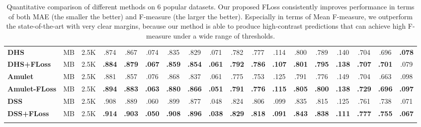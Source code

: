 \documentclass[10pt,twocolumn,letterpaper]{article}
\begin{document}
{\begin{table*}[!htp]
{\begin{tabular}{lcc|ccc|ccc|ccc|ccc|ccc}
  \hline
  \textbf{DHS}~\cite{liu2016dhsnet} &
  MB &
  2.5K & .874 & .867 & .074 & .835 & .829 & .071 &
  .782 & .777 & .114 & .800 & .789 & .140 & .704 & .696 & \textbf{.078} \\
  \textbf{DHS+FLoss}~\cite{liu2016dhsnet} &
  MB & 2.5K &
  \textbf{.884} & \textbf{.879} & \textbf{.067} & \textbf{.859} &
  \textbf{.854} & \textbf{.061} & \textbf{.792} & \textbf{.786} &
  \textbf{.107} & \textbf{.801} & \textbf{.795} & \textbf{.138} &
  \textbf{.707} & \textbf{.701} & .079 \\
  \hline
  \textbf{Amulet}~\cite{zhang2017amulet} &
  MB & 2.5K &
  .881 & .857 & .076 & .868 & .837 & .061 &
  .775 & .753 & .125 & .791 & .776 & .149 & .704 & .663 & .098 \\
  \textbf{Amulet-FLoss}  &  MB & 2.5K &
  \textbf{.894} & \textbf{.883} & \textbf{.063} & \textbf{.880} &
  \textbf{.866} & \textbf{.051} & \textbf{.791} & \textbf{.776} &
  \textbf{.115} & \textbf{.805} & \textbf{.800} & \textbf{.138} &
  \textbf{.729} & \textbf{.696} & \textbf{.097} \\
  \hline
  \textbf{DSS}~\cite{hou2017deeply} & MB &
  2.5K & .908 & .889 & .060 & .899 & .877 & .048 &
  .824 & .806 & .099 & .835 & .815 & .125 & .761 & .738 & .071 \\
  \textbf{DSS+FLoss} &
  MB & 2.5K &
  \textbf{.914} & \textbf{.903} & \textbf{.050} & \textbf{.908} &
  \textbf{.896} & \textbf{.038} & \textbf{.829} & \textbf{.818} &
  \textbf{.091} & \textbf{.843} & \textbf{.838} & \textbf{.111} &
  \textbf{.777} & \textbf{.755} & \textbf{.067} \\
  \bottomrule[1pt]
  \vspace{0.5pt}
  \end{tabular}
  }\vspace{-8pt}
  \caption{Quantitative comparison of different methods on 6 popular datasets.
  Our proposed FLoss consistently improves performance in terms of both MAE (the smaller the better)
  and F-measure (the larger the better).
  Especially in terms of Mean F-measure, we outperform the state-of-the-art with very
  clear margins,  because our method is able to produce high-contrast predictions that can
  achieve high F-measure under a wide range of thresholds.
  }
  \label{tab:quantitative}\vspace{-12pt}
\end{table*}
}
\end{document}
